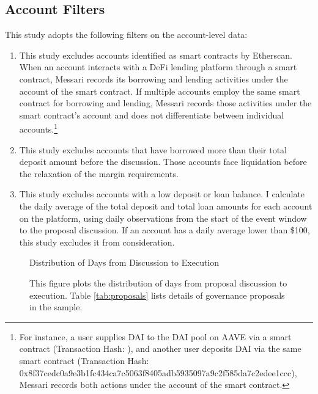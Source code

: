     \subsection{  Account Filters}\label{secA:DataFilter_account}
 This study adopts the following filters on the account-level data:
  \begin{enumerate}
      \item This study excludes accounts identified as smart contracts by Etherscan. When an account interacts with a DeFi lending platform through a smart contract, Messari records its borrowing and lending activities under the account of the smart contract. If multiple accounts employ the same smart contract for borrowing and lending, Messari records those activities under the smart contract's account and does not differentiate between individual accounts.\footnote{For instance, a user supplies DAI to the DAI pool on AAVE via a smart contract (Transaction Hash: ), and another user deposits DAI via the same smart contract (Transaction Hash: 0x8f37cedc0a9e3b1fc434ca7c5063f8405adb5935097a9c2f585da7c2edee1ccc), Messari records both actions under the account of the smart contract.} 
      \item  This study excludes accounts that have borrowed more than their total deposit amount before the discussion. Those accounts face liquidation before the relaxation of the margin requirements.
      \item This study excludes accounts with a low deposit or loan balance. I calculate the daily average of the total deposit and total loan amounts for each account on the platform, using daily observations from the start of the event window to the proposal discussion. If an account has a daily average lower than \$100, this study excludes it from consideration.
  \end{enumerate}

\clearpage
\begin{figure}[ht!]
\centering
\caption{Distribution of Days from Discussion to Execution}\label{figA:hist_days}
\caption*{This figure plots the distribution of days from proposal discussion to execution. Table \ref{tab:proposals} lists details of governance proposals in the sample. }

\end{figure}





